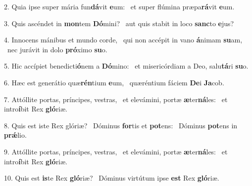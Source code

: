 2. Quia ipse super mária fun\textbf{dá}vit \textbf{e}um: \ast\  et super flúmina præpa\textbf{rá}vit \textbf{e}um.\

3. Quis ascéndet in \textbf{mon}tem \textbf{Dó}mini? \ast\  aut quis stabit in loco \textbf{sanc}to \textbf{e}jus?\

4. Innocens mánibus et mundo corde, \dag\  qui non accépit in vano \textbf{á}nimam \textbf{su}am, \ast\  nec jurávit in dolo \textbf{pró}ximo \textbf{su}o.\

5. Hic accípiet benedicti\textbf{ó}nem a \textbf{Dó}mino: \ast\  et misericórdiam a Deo, salu\textbf{tá}ri \textbf{su}o.\

6. Hæc est generátio quæ\textbf{rén}tium \textbf{e}um, \ast\  quæréntium fáciem \textbf{De}i \textbf{Ja}cob.\

7. Attóllite portas, príncipes, vestras, \dag\  et elevámini, portæ \textbf{æ}ter\textbf{ná}les: \ast\  et intro\textbf{í}bit Rex \textbf{gló}riæ.\

8. Quis est iste Rex glóriæ? \dag\  Dóminus \textbf{for}tis et \textbf{pot}ens: \ast\  Dóminus \textbf{pot}ens in \textbf{prǽ}lio.\

9. Attóllite portas, príncipes, vestras, \dag\  et elevámini, portæ \textbf{æ}ter\textbf{ná}les: \ast\  et intro\textbf{í}bit Rex \textbf{gló}riæ.\

10. Quis est \textbf{is}te Rex \textbf{gló}riæ? \ast\  Dóminus virtútum ipse \textbf{est} Rex \textbf{gló}riæ.\

